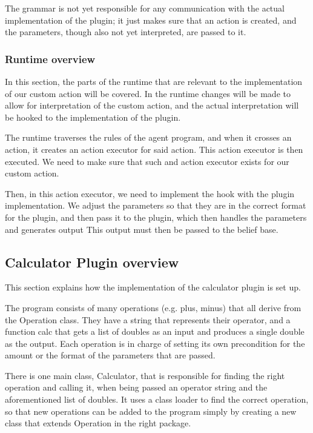 The grammar is not yet responsible for any communication with the actual implementation of the plugin; it just makes sure that an action is created, and the parameters, though also not yet interpreted, are passed to it.

\subsubsection{Runtime overview}
In this section, the parts of the runtime that are relevant to the implementation of our custom action will be covered. In the runtime changes will be made to allow for interpretation of the custom action, and the actual interpretation will be hooked to the implementation of the plugin. \\ \par

The runtime traverses the rules of the agent program, and when it crosses an action, it creates an action executor for said action. This action executor is then executed. We need to make sure that such and action executor exists for our custom action. \\ \par

Then, in this action executor, we need to implement the hook with the plugin implementation. We adjust the parameters so that they are in the correct format for the plugin, and then pass it to the plugin, which then handles the parameters and generates output This output must then be passed to the belief base.

\subsection{Calculator Plugin overview}
This section explains how the implementation of the calculator plugin is set up. \\ \par

The program consists of many operations (e.g. plus, minus) that all derive from the Operation class. They have a string that represents their operator, and a function calc that gets a list of doubles as an input and produces a single double as the output. Each operation is in charge of setting its own precondition for the amount or the format of the parameters that are passed. \\ \par

There is one main class, Calculator, that is responsible for finding the right operation and calling it, when being passed an operator string and the aforementioned list of doubles. It uses a class loader to find the correct operation, so that new operations can be added to the program simply by creating a new class that extends Operation in the right package. \\ \par